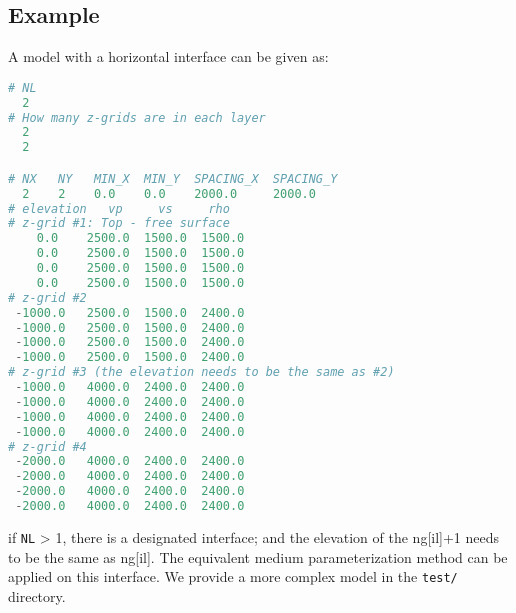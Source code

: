 \subsection{Example}
A model with a horizontal interface can be given as:
\begin{lstlisting}[language=python, title=test.md3lay, frame=tb]
# NL
  2
# How many z-grids are in each layer
  2
  2

# NX   NY   MIN_X  MIN_Y  SPACING_X  SPACING_Y 
  2    2    0.0    0.0    2000.0     2000.0
# elevation   vp     vs     rho  
# z-grid #1: Top - free surface
    0.0    2500.0  1500.0  1500.0 
    0.0    2500.0  1500.0  1500.0 
    0.0    2500.0  1500.0  1500.0 
    0.0    2500.0  1500.0  1500.0 
# z-grid #2 
 -1000.0   2500.0  1500.0  2400.0   
 -1000.0   2500.0  1500.0  2400.0
 -1000.0   2500.0  1500.0  2400.0
 -1000.0   2500.0  1500.0  2400.0 
# z-grid #3 (the elevation needs to be the same as #2)
 -1000.0   4000.0  2400.0  2400.0   
 -1000.0   4000.0  2400.0  2400.0
 -1000.0   4000.0  2400.0  2400.0
 -1000.0   4000.0  2400.0  2400.0 
# z-grid #4 
 -2000.0   4000.0  2400.0  2400.0   
 -2000.0   4000.0  2400.0  2400.0
 -2000.0   4000.0  2400.0  2400.0
 -2000.0   4000.0  2400.0  2400.0  
\end{lstlisting}
if \texttt{NL} > 1, there is a designated interface; and the elevation of the ng[il]+1 needs to be the same as ng[il]. The equivalent medium parameterization method can be applied on this interface.
We provide a more complex model in the \texttt{test/} directory.
